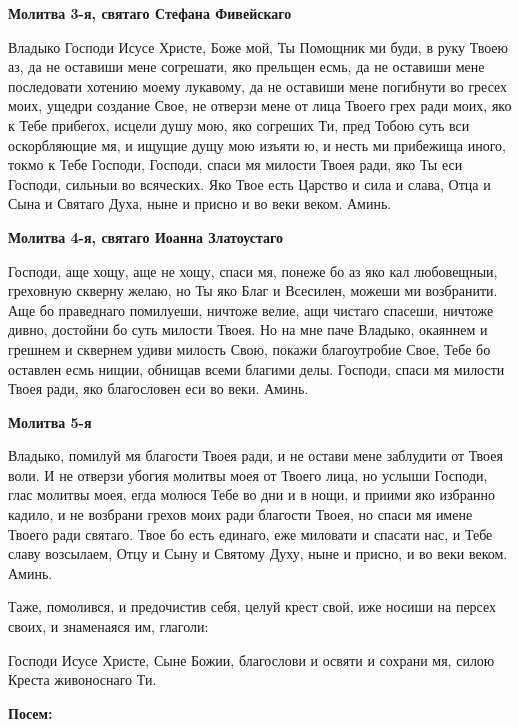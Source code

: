 \bfseries Молитва 3-я, святаго Стефана Фивейскаго\normalfont{}


Владыко Господи Исусе Христе, Боже мой, Ты Помощник ми буди, в руку Твоею аз, да не оставиши мене согрешати, яко прельщен есмь, да не оставиши мене последовати хотению моему лукавому, да не оставиши мене погибнути во гресех моих, ущедри создание Свое, не отверзи мене от лица Твоего грех ради моих, яко к Тебе прибегох, исцели душу мою, яко согреших Ти, пред Тобою суть вси оскорбляющие мя, и ищущие дущу мою изъяти ю, и несть ми прибежища иного, токмо к Тебе Господи, Господи, спаси мя милости Твоея ради, яко Ты еси Господи, сильныи во всяческих. Яко Твое есть Царство и сила и слава, Отца и Сына и Святаго Духа, ныне и присно и во веки веком. Аминь.





\bfseries Молитва 4-я, святаго Иоанна Златоустаго\normalfont{}


Господи, аще хощу, аще не хощу, спаси мя, понеже бо аз яко кал любовещныи, греховную скверну желаю, но Ты яко Благ и Всесилен, можеши ми возбранити. Аще бо праведнаго помилуеши, ничтоже велие, ащи чистаго спасеши, ничтоже дивно, достойни бо суть милости Твоея. Но на мне паче Владыко, окаяннем и грешнем и сквернем удиви милость Свою, покажи благоутробие Свое, Тебе бо оставлен есмь нищии, обнищав всеми благими делы. Господи, спаси мя милости Твоея ради, яко благословен еси во веки. Аминь.





\bfseries Молитва 5-я\normalfont{}


Владыко, помилуй мя благости Твоея ради, и не остави мене заблудити от Твоея воли. И не отверзи убогия молитвы моея от Твоего лица, но услыши Господи, глас молитвы моея, егда молюся Тебе во дни и в нощи, и приими яко избранно кадило, и не возбрани грехов моих ради благости Твоея, но спаси мя имене Твоего ради святаго. Твое бо есть единаго, еже миловати и спасати нас, и Тебе славу возсылаем, Отцу и Сыну и Святому Духу, ныне и присно, и во веки веком. Аминь.


Таже, помолився, и предочистив себя, целуй крест свой, иже носиши на персех своих, и знаменаяся им, глаголи:


Господи Исусе Христе, Сыне Божии, благослови и освяти и сохрани мя, силою Креста живоноснаго Ти.





\bfseries Посем:\normalfont{}


